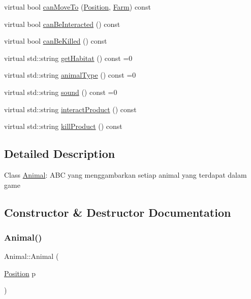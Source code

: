 \begin{DoxyCompactItemize}
virtual bool \mbox{\hyperlink{class_animal_a0529aaf00a6368ea123110683cc4e2f2}{can\+Move\+To}} (\mbox{\hyperlink{class_position}{Position}}, \mbox{\hyperlink{class_farm}{Farm}}) const
\item 
virtual bool \mbox{\hyperlink{class_animal_a2810cff283192d06f93612364b8120f9}{can\+Be\+Interacted}} () const
\item 
virtual bool \mbox{\hyperlink{class_animal_a87ada682cad67c91fb0cd0fda3395cd5}{can\+Be\+Killed}} () const
\item 
virtual std\+::string \mbox{\hyperlink{class_animal_a3de687fb42b792132a09176c4a0e2125}{get\+Habitat}} () const =0
\item 
virtual std\+::string \mbox{\hyperlink{class_animal_a1969cf8cf77a7900207420ae26f856e9}{animal\+Type}} () const =0
\item 
virtual std\+::string \mbox{\hyperlink{class_animal_aca8216576b21b87f761a34686a4968a8}{sound}} () const =0
\item 
virtual std\+::string \mbox{\hyperlink{class_animal_a8e99d809fbff9cea27dee5a785932dc6}{interact\+Product}} () const
\item 
virtual std\+::string \mbox{\hyperlink{class_animal_a4d4e70aed7f889574600e8492f419948}{kill\+Product}} () const
\end{DoxyCompactItemize}


\subsection{Detailed Description}
Class \mbox{\hyperlink{class_animal}{Animal}}\+: A\+BC yang menggambarkan setiap animal yang terdapat dalam game 

\subsection{Constructor \& Destructor Documentation}
\mbox{\label{class_animal_aeaee0d014fa24437eb16bf18cc18043e}} 
\subsubsection{\texorpdfstring{Animal()}{Animal()}}
{\footnotesize\ttfamily Animal\+::\+Animal (\begin{DoxyParamCaption}\item[{\mbox{\hyperlink{class_position}{Position}}}]{p }\end{DoxyParamCaption})}

